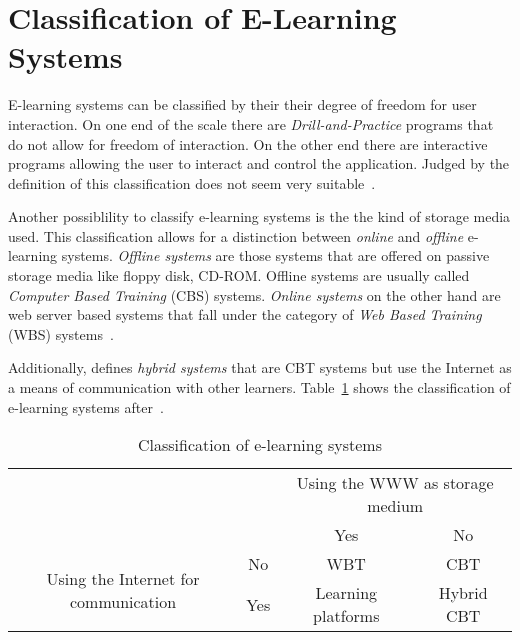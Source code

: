 
\section{Classification of E-Learning Systems} %
\label{sec:elearn:classification}

E-learning systems can be classified by their their degree of freedom for 
user interaction. On one end of the scale there are \emph{Drill-and-Practice} 
programs that do not allow for freedom of interaction. On the other end there 
are interactive programs allowing the user to interact and control the 
application. Judged by the definition of  this 
classification does not seem very suitable~.

Another possiblility to classify e-learning systems is the the kind of storage
media used. This classification allows for a distinction between \emph{online} 
and \emph{offline} e-learning systems. \emph{Offline systems} are those systems
that are offered on passive storage media like floppy disk, CD-ROM.
Offline systems are usually called \emph{Computer Based Training} (CBS) systems.
\emph{Online systems} on the other hand are web server based systems that fall
under the category of \emph{Web Based Training} (WBS) 
systems~.

Additionally,  \citeyear{Richert2007} defines
\emph{hybrid systems} that are CBT systems but use the Internet as a means of
communication with other learners.
Table~\ref{table:elearningsystems} shows the classification of e-learning systems
after~.
\begin{table}[htbp]
\begin{tabular}{|c|c|c|c|}
  \hline
  \multicolumn{2}{|c|}{} & \multicolumn{2}{|c|}{Using the WWW as storage medium} \\
  \cline{3-4}
  \multicolumn{2}{|c|}{} & Yes & No \\
  \hline
  \multirow{2}{*}{Using the Internet for communication} & No & WBT & CBT \\
  \cline{2-4}
   & Yes & Learning platforms & Hybrid CBT \\
  \hline
\end{tabular}
\caption{Classification of e-learning systems}
\label{table:elearningsystems}
\end{table}

